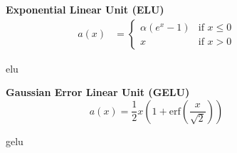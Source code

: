 \begin{figure}[!h]
\begin{minipage}{0.45\textwidth}
    \centering
{}
\caption{elu}
    \label{fig:elu}
\end{minipage}
\hfill
\begin{minipage}{0.5\textwidth}
    \textbf{Exponential Linear Unit (ELU)}
   \begin{align}
        a(x) &= 
        \begin{cases}
        \alpha \left(e^x -1\right)  & \text{if } x \leq 0 \\
        x  & \text{if } x > 0 
  \end{cases}
\end{align}
\end{minipage}
\end{figure}

\begin{figure}[!h]
\begin{minipage}{0.45\textwidth}
    \centering
{}
\caption{gelu}
    \label{fig:gelu}
\end{minipage}
\hfill
\begin{minipage}{0.5\textwidth}
    \textbf{Gaussian Error Linear Unit (GELU)}
   \begin{equation}
       a(x) = \frac{1}{2} x \left( 1+\text{erf} \left( \frac{x}{\sqrt{2}}\right)\right)
   \end{equation}
\end{minipage}
\end{figure}